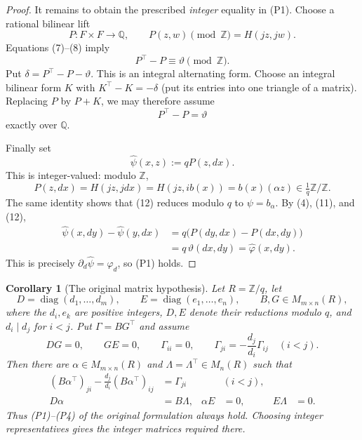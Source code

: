 \documentclass[11pt]{article}
\newcommand{\Z}{\mathbb Z}
\newcommand{\Q}{\mathbb Q}
\newtheorem{corollary}[theorem]{Corollary}
\theoremstyle{remark}
\begin{document}
\begin{proof}
It remains to obtain the prescribed \emph{integer} equality in
(P1).  Choose a rational bilinear lift
\[
        P:F\times F\longrightarrow\Q,\qquad
        P(z,w)\pmod{\Z}=H(jz,jw).
\]
Equations (7)--(8) imply
\[
                     P^\top-P\equiv\vartheta\pmod{\Z}.         \tag{10}
\]
Put \(\delta=P^\top-P-\vartheta\).  This is an integral alternating
form.  Choose an integral bilinear form \(K\) with
\(K^\top-K=-\delta\) (put its entries into one triangle of a matrix).
Replacing \(P\) by \(P+K\), we may therefore assume
\[
                            P^\top-P=\vartheta                \tag{11}
\]
exactly over \(\Q\).

Finally set
\[
                    \widehat\psi(x,z):=qP(z,dx).               \tag{12}
\]
This is integer-valued: modulo \(\Z\),
\[
 P(z,dx)=H(jz,jdx)=H(jz,ib(x))
        =b(x)(\alpha z)\in\tfrac1q\Z/\Z.
\]
The same identity shows that (12) reduces modulo \(q\) to
\(\psi=b_\alpha\).  By (4), (11), and (12),
\[
\begin{aligned}
\widehat\psi(x,dy)-\widehat\psi(y,dx)
 &=q\bigl(P(dy,dx)-P(dx,dy)\bigr)\\
 &=q\,\vartheta(dx,dy)
  =\widehat\varphi(x,dy).
\end{aligned}
\]
This is precisely \(\partial_d\widehat\psi=\widehat\varphi_d\), so
(P1) holds.
\end{proof}

\begin{corollary}[The original matrix hypothesis]\label{cor:matrix}
Let \(R=\Z/q\), let
\[
 D=\operatorname{diag}(d_1,\ldots,d_m),\qquad
 E=\operatorname{diag}(e_1,\ldots,e_n),
 \qquad B,G\in M_{m\times n}(R),
\]
where the \(d_i,e_k\) are positive integers, \(D,E\) denote their
reductions modulo \(q\), and \(d_i\mid d_j\) for \(i<j\).  Put
\(\Gamma=BG^\top\) and assume
\[
 DG=0,\qquad GE=0,\qquad
 \Gamma_{ii}=0,\qquad
 \Gamma_{ji}=-\frac{d_j}{d_i}\Gamma_{ij}\quad(i<j).           \tag{13}
\]
Then there are \(\alpha\in M_{m\times n}(R)\) and
\(\Lambda=\Lambda^\top\in M_n(R)\) such that
\begin{align*}
 (B\alpha^\top)_{ji}-\frac{d_j}{d_i}(B\alpha^\top)_{ij}
     &=\Gamma_{ji} &&(i<j),\\
 D\alpha&=B\Lambda,&
 \alpha E&=0,&
 E\Lambda&=0.
\end{align*}
Thus \textup{(P1)--(P4)} of the original formulation always hold.
Choosing integer representatives gives the integer matrices required
there.
\end{corollary}
\end{document}
